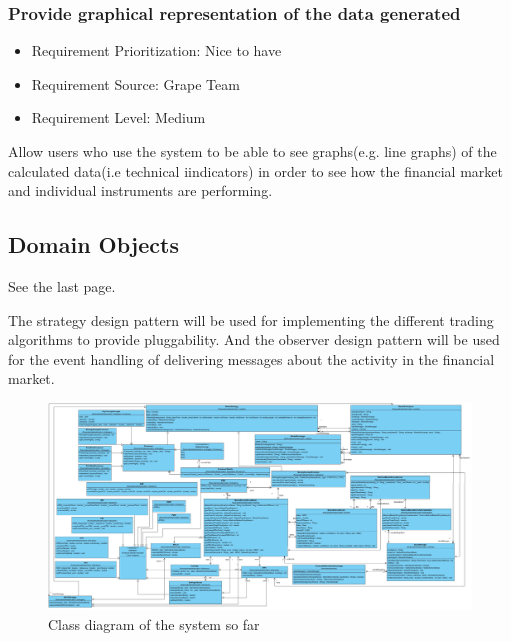 \documentclass[12pt]{article}
\begin{document}
			\subsubsection{Provide graphical representation of the data generated}
			\begin{itemize}
				\item Requirement Prioritization: Nice to have
				\item Requirement Source: Grape Team 
				\item Requirement Level: Medium	
			\end{itemize}
			Allow users who use the system to be able to see graphs(e.g. line graphs) of the calculated data(i.e technical iindicators) in order to see how the financial market and individual instruments are performing.
					  
		\subsection{Domain Objects}	
		See the last page.
								
			The strategy design pattern will be used for implementing the different trading algorithms to provide pluggability.
			And the observer design pattern will be used for the event handling of delivering messages about the activity in the financial market.
		\clearpage 
		\newpage	
			\begin{figure}[th]
			\centering
			\vbox{\vspace{-5em}\includegraphics[scale=0.35, angle=90]{./ClassDiagram.jpg}}	
			\caption{Class diagram of the system so far}
			\label{domain objects}
			\end{figure}
		
	\clearpage	
	\newpage				
\end{document}
